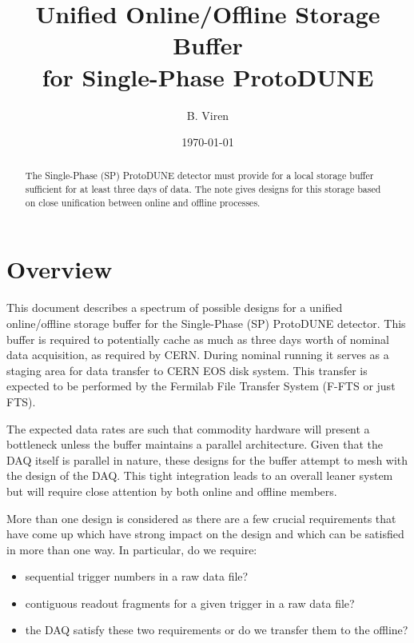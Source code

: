 \documentclass[pdftex,12pt,letter]{article}
\title{Unified Online/Offline Storage Buffer\\for Single-Phase ProtoDUNE}
\date{\today}
\author{B. Viren}
\begin{document}
\maketitle

\begin{abstract}
  The Single-Phase (SP) ProtoDUNE detector must provide for a local storage
  buffer sufficient for at least three days of data.  The note gives
  designs for this storage based on close unification between online
  and offline processes.
\end{abstract}

\tableofcontents

\pagebreak

\section{Overview}

This document describes a spectrum of possible designs for a unified
online/offline storage buffer for the Single-Phase (SP) ProtoDUNE
detector.  This buffer is required to potentially cache as much as
three days worth of nominal data acquisition, as required by CERN.
During nominal running it serves as a staging area for data transfer
to CERN EOS disk system.  This transfer is expected to be performed by
the Fermilab File Transfer System (F-FTS or just FTS).

The expected data rates are such that commodity hardware will present
a bottleneck unless the buffer maintains a parallel architecture.
Given that the DAQ itself is parallel in nature, these designs for the
buffer attempt to mesh with the design of the DAQ.  This tight
integration leads to an overall leaner system but will require close
attention by both online and offline members.

More than one design is considered as there are a few crucial
requirements that have come up which have strong impact on the design
and which can be satisfied in more than one way.  In particular, do we
require:

\begin{itemize}
\item sequential trigger numbers in a raw data file?
\item contiguous readout fragments for a given trigger in a raw data file?
\item the DAQ satisfy these two requirements or do we transfer them to the offline?
\end{itemize}
\end{document}
